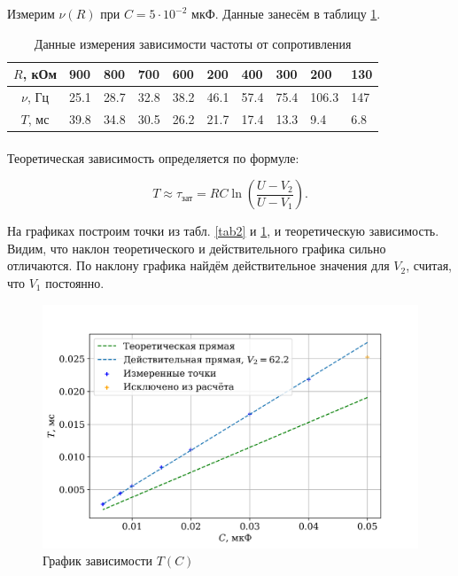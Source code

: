 \documentclass[a4paper,12pt]{article} %
\begin{document}
Измерим $\nu(R)$ при $C = 5 \cdot 10^{-2}$ мкФ. Данные занесём в таблицу \ref{tab3}.

\begin{table}[h]
\begin{center}
\begin{tabularx}{\textwidth}{|c||X|X|X|X|X|X|X|X|X|}
\hline
$R$, кОм  & 900  & 800  & 700  & 600  & 200  & 400  & 300  & 200   & 130 \\
\hline
$\nu$, Гц & 25.1 & 28.7 & 32.8 & 38.2 & 46.1 & 57.4 & 75.4 & 106.3 & 147 \\
\hline
$T$, мс   & 39.8 & 34.8 & 30.5 & 26.2 & 21.7 & 17.4 & 13.3 & 9.4 & 6.8 \\
\hline
\end{tabularx} 
\caption{Данные измерения зависимости частоты от сопротивления}
\label{tab3}
\end{center}
\end{table}

\paragraph{} Теоретическая зависимость определяется по формуле:

\[T \approx \tau_\text{зат} = RC \ln \left( \frac{U - V_2}{U - V_1} \right).\]

На графиках построим точки из табл. \ref{tab2} и \ref{tab3}, и теоретическую зависимость.  Видим, что наклон теоретического и действительного графика сильно отличаются. По наклону графика найдём действительное значения для $V_2$, считая, что $V_1$ постоянно.

\begin{figure}
\begin{center}
\includegraphics[width=\textwidth]{plot3.png}
\caption{График зависимости $T(C)$}
\label{fig:plot3}
\end{center}
\end{figure}
\end{document}
